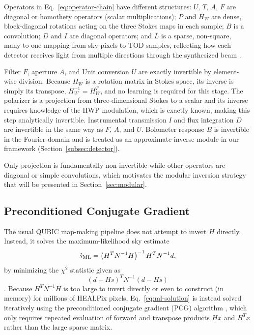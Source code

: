 \documentclass[a4paper,11pt]{article}
\begin{document}
Operators in Eq.~\ref{eq:operator-chain} have different structures: $U$, $T$, $A$, $F$ are diagonal or homothety operators (scalar multiplications);
$P$ and $H_W$ are dense, block-diagonal rotations acting on the three
Stokes maps in each sample; $B$ is a convolution; $D$ and $I$ are diagonal
operators; and $L$ is a sparse, non-square, many-to-one mapping from sky pixels to TOD samples, reflecting how each detector receives light from multiple directions through the synthesized beam \cite{mousset2022qubic2}. 

Filter $F$, aperture $A$, and Unit conversion $U$ are exactly invertible by element-wise division. Because $H_W$ is a rotation matrix in Stokes space, its inverse is simply its transpose, $H_W^{-1} = H_W^T$, and no learning is required for this stage. The polarizer is a projection from three-dimensional Stokes to a scalar and its inverse requires knowledge of the HWP modulation, which is exactly known, making this step analytically invertible. Instrumental transmission $I$ and flux integration $D$ are invertible in the same way as $F$, $A$, and $U$. Bolometer response $B$ is invertible in the Fourier domain and is treated as an approximate-inverse module in our framework (Section~\ref{subsec:detector}). 

Only projection is fundamentally non-invertible while other operators are diagonal or simple convolutions, which motivates the modular inversion strategy that will be presented in Section~\ref{sec:modular}.

\subsection{Preconditioned Conjugate Gradient}
\label{subsec:pcg-method}

The usual QUBIC map-making pipeline does not attempt to invert $H$
directly. Instead, it solves the maximum-likelihood sky estimate
\begin{equation}
    \hat{s}_{\rm ML} = \left( H^T N^{-1} H \right)^{-1} H^T N^{-1} d,
    \label{eq:ml-solution}
\end{equation}
by minimizing the $\chi^2$ statistic given as \cite{mousset2022qubic2}
\begin{equation}
    (d-Hs)^T N^{-1} (d-Hs) 
\end{equation}. Because $H^T N^{-1}
H$ is too large to invert directly or even to construct (in memory) for millions of HEALPix pixels, Eq.~\ref{eq:ml-solution} is instead solved iteratively
using the preconditioned conjugate gradient (PCG) algorithm \cite{kaasschieter1988}, which only requires repeated evaluation of
forward and transpose products $Hx$ and $H^Tx$ rather than the
large sparse matrix.
\end{document}

